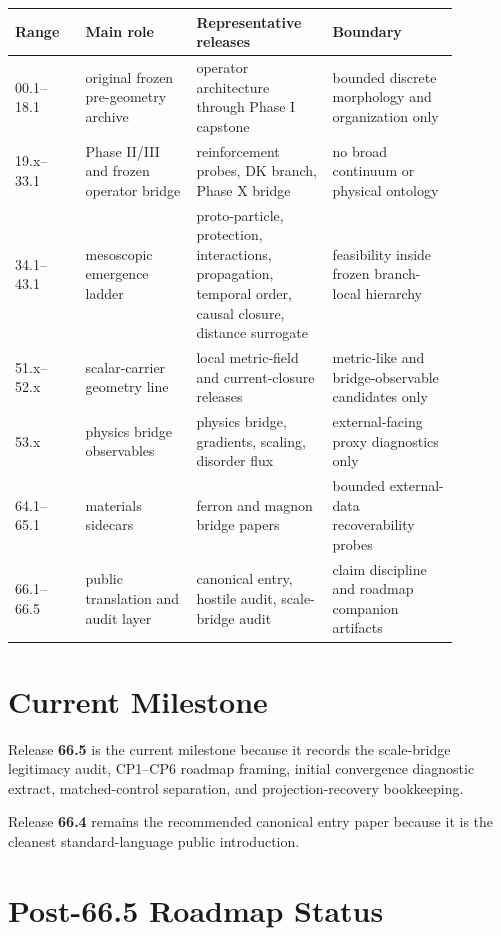 \documentclass[10pt]{article}
\begin{document}
\begin{center}
\scriptsize
\begin{tabular}{p{0.14\linewidth}p{0.22\linewidth}p{0.27\linewidth}p{0.25\linewidth}}
\toprule
Range & Main role & Representative releases & Boundary \\
\midrule
00.1--18.1 & original frozen pre-geometry archive & operator architecture through Phase I capstone & bounded discrete morphology and organization only \\
19.x--33.1 & Phase II/III and frozen operator bridge & reinforcement probes, DK branch, Phase X bridge & no broad continuum or physical ontology \\
34.1--43.1 & mesoscopic emergence ladder & proto-particle, protection, interactions, propagation, temporal order, causal closure, distance surrogate & feasibility inside frozen branch-local hierarchy \\
51.x--52.x & scalar-carrier geometry line & local metric-field and current-closure releases & metric-like and bridge-observable candidates only \\
53.x & physics bridge observables & physics bridge, gradients, scaling, disorder flux & external-facing proxy diagnostics only \\
64.1--65.1 & materials sidecars & ferron and magnon bridge papers & bounded external-data recoverability probes \\
66.1--66.5 & public translation and audit layer & canonical entry, hostile audit, scale-bridge audit & claim discipline and roadmap companion artifacts \\
\bottomrule
\end{tabular}
\end{center}

\section*{Current Milestone}

Release \textbf{66.5} is the current milestone because it records the scale-bridge legitimacy audit, CP1--CP6 roadmap framing, initial convergence diagnostic extract, matched-control separation, and projection-recovery bookkeeping.

Release \textbf{66.4} remains the recommended canonical entry paper because it is the cleanest standard-language public introduction.

\section*{Post-66.5 Roadmap Status}
\end{document}
